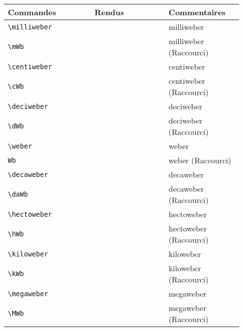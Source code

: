 \documentclass[a4paper,12pt]{article}
\newcommand{\rac}{({\color{red}Raccourci})}
\begin{document}
	\noindent
	\begin{tabular}{|p{0.35\linewidth}|p{0.3\linewidth}|p{0.3\linewidth}|}
		\hline
 			\textbf{Commandes}&\textbf{Rendus}&\textbf{Commentaires}
 		\\\hline\hline
			\verb!\milliweber!		& 	\milliweber		&	milliweber\\
		\hline
			\verb!\mWb!		& 	\mWb		&	milliweber \rac\\
		\hline
			\verb!\centiweber!		& 	\centiweber	&	centiweber\\
		\hline
			\verb!\cWb!		& 	\cWb	&	centiweber \rac\\
		\hline
			\verb!\deciweber!		& 	\deciweber		&	deciweber\\
		\hline
			\verb!\dWb!		& 	\dWb		&	deciweber \rac\\
		\hline
			\verb!\weber!		& 	\weber	&	weber\\
		\hline
			\verb!Wb!		& 	\Wb	&	weber \rac\\
		\hline
			\verb!\decaweber!		& 	\decaweber		&	decaweber\\
		\hline
			\verb!\daWb!		& 	\daWb		&	decaweber \rac\\
		\hline
			\verb!\hectoweber!		& 	\hectoweber	&	hectoweber\\
		\hline
			\verb!\hWb!		& 	\hWb	&	hectoweber \rac\\
		\hline
			\verb!\kiloweber!		& 	\kiloweber		&	kiloweber\\
		\hline
			\verb!\kWb!		& 	\kWb		&	kiloweber \rac\\
		\hline
			\verb!\megaweber!		& 	\megaweber	&	megaweber\\
		\hline
			\verb!\MWb!		& 	\MWb	&	megaweber \rac\\
		\hline
	\end{tabular}
\end{document}
